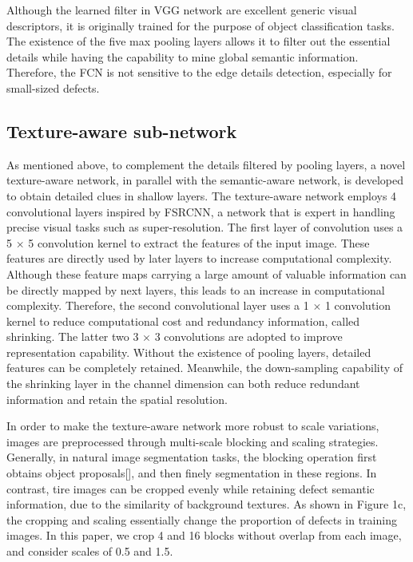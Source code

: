\documentclass{article}
\begin{document}
Although the learned filter in VGG network are excellent generic visual descriptors, it is originally trained for the purpose of object classification tasks. The existence of the five max pooling layers allows it to filter out the essential details while having the capability to mine global semantic information. Therefore, the FCN is not sensitive to the edge details detection, especially for small-sized defects.

\subsection{Texture-aware sub-network}
\label{Texture-aware sub-network}
As mentioned above, to complement the details filtered by pooling layers, a novel texture-aware network, in parallel with the semantic-aware network, is developed to obtain detailed clues in shallow layers. The texture-aware network employs 4 convolutional layers inspired by FSRCNN\cite{dong2016accelerating}, a network that is expert in handling precise visual tasks such as super-resolution. The first layer of convolution uses a 5 $\times$ 5 convolution kernel to extract the features of the input image. These features are directly used by later layers to increase computational complexity. Although these feature maps carrying a large amount of valuable information can be directly mapped by next layers, this leads to an increase in computational complexity. Therefore, the second convolutional layer uses a 1 $\times$ 1 convolution kernel to reduce computational cost and redundancy information, called shrinking. The latter two 3 $\times$ 3 convolutions are adopted to improve representation capability. Without the existence of pooling layers, detailed features can be completely retained. Meanwhile, the down-sampling capability of the shrinking layer in the channel dimension can both reduce redundant information and retain the spatial resolution.

In order to make the texture-aware network more robust to scale variations, images are preprocessed through multi-scale blocking and scaling strategies. Generally, in natural image segmentation tasks, the blocking operation first obtains object proposals[], and then finely segmentation in these regions. In contrast, tire images can be cropped evenly while retaining defect semantic information, due to the similarity of background textures. As shown in Figure 1c, the cropping and scaling essentially change the proportion of defects in training images. In this paper, we crop 4 and 16 blocks without overlap from each image, and consider scales of 0.5 and 1.5.
\end{document}

